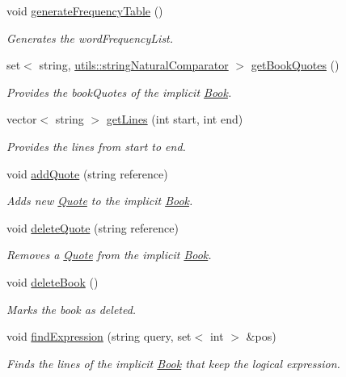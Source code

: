 \begin{DoxyCompactItemize}
void \hyperlink{class_book_a8d232eaeb4207707d77bc18e6dd467cd}{generate\+Frequency\+Table} ()
\begin{DoxyCompactList}\small\item\em Generates the word\+Frequency\+List. \end{DoxyCompactList}\item 
set$<$ string, \hyperlink{structutils_1_1string_natural_comparator}{utils\+::string\+Natural\+Comparator} $>$ \hyperlink{class_book_af817baa430adcda62ba5744c910f8e48}{get\+Book\+Quotes} ()
\begin{DoxyCompactList}\small\item\em Provides the book\+Quotes of the implicit \hyperlink{class_book}{Book}. \end{DoxyCompactList}\item 
vector$<$ string $>$ \hyperlink{class_book_a955c01f083e78f81c358f5d485f0169e}{get\+Lines} (int start, int end)
\begin{DoxyCompactList}\small\item\em Provides the lines from start to end. \end{DoxyCompactList}\item 
void \hyperlink{class_book_a97c2374d514327be5d8f74abd0ff4ea3}{add\+Quote} (string reference)
\begin{DoxyCompactList}\small\item\em Adds new \hyperlink{class_quote}{Quote} to the implicit \hyperlink{class_book}{Book}. \end{DoxyCompactList}\item 
void \hyperlink{class_book_a0829e0eaf0769c2bdbd149d2cf2ce20b}{delete\+Quote} (string reference)
\begin{DoxyCompactList}\small\item\em Removes a \hyperlink{class_quote}{Quote} from the implicit \hyperlink{class_book}{Book}. \end{DoxyCompactList}\item 
void \hyperlink{class_book_a34626be6b35f4ac97ffd3571210a1393}{delete\+Book} ()
\begin{DoxyCompactList}\small\item\em Marks the book as deleted. \end{DoxyCompactList}\item 
void \hyperlink{class_book_acc3fa87ab1c8eb2186a4c2e1e541f368}{find\+Expression} (string query, set$<$ int $>$ \&pos)
\begin{DoxyCompactList}\small\item\em Finds the lines of the implicit \hyperlink{class_book}{Book} that keep the logical expression. \end{DoxyCompactList}\item 

\end{DoxyCompactItemize}
